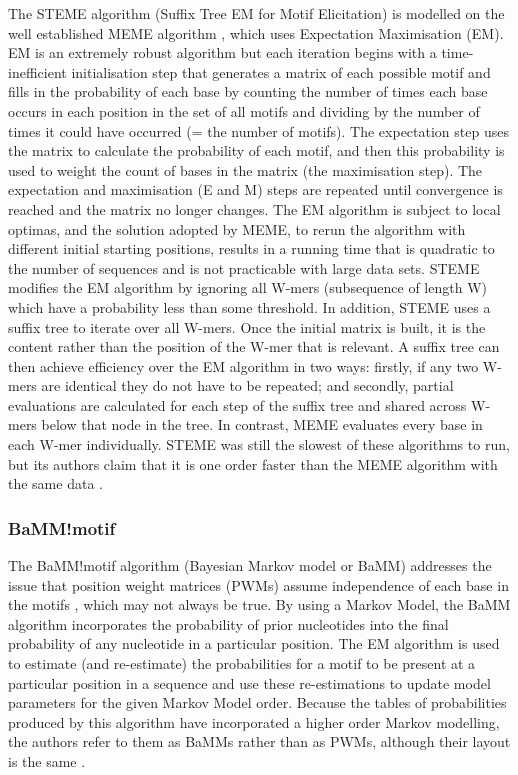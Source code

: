 \documentclass[12pt, onecolumn, oneside]{gsajnl}
\begin{document}
The STEME algorithm (Suffix Tree EM for Motif Elicitation) \citep{reid2011steme} is modelled on the well established MEME algorithm \citep{bailey2009meme}, which uses Expectation Maximisation (EM). EM is an extremely robust algorithm but each iteration begins with a time-inefficient initialisation step that generates a matrix of each possible motif and fills in the probability of each base by counting the number of times each base occurs in each position in the set of all motifs and dividing by the number of times it could have occurred (= the number of motifs). The expectation step uses the matrix to calculate the probability of each motif, and then this probability is used to weight the count of bases in the matrix (the maximisation step). The expectation and maximisation (E and M) steps are repeated until convergence is reached and the matrix no longer changes. The EM algorithm is subject to local optimas, and the solution adopted by MEME, to rerun the algorithm with different initial starting positions, results in a running time that is quadratic to the number of sequences and is not practicable with large data sets. STEME modifies the EM algorithm by ignoring all W-mers (subsequence of length W) which have a probability less than some threshold. In addition, STEME uses a suffix tree to iterate over all W-mers. Once the initial matrix is built, it is the content rather than the position of the W-mer that is relevant. A suffix tree can then achieve efficiency over the EM algorithm in two ways: firstly, if any two W-mers are identical they do not have to be repeated; and secondly, partial evaluations are calculated for each step of the suffix tree and shared across W-mers below that node in the tree. In contrast, MEME evaluates every base in each W-mer individually. STEME was still the slowest of these algorithms to run, but its authors claim that it is one order faster than the MEME algorithm with the same data \citep{reid2011steme}.

\subsubsection{BaMM!motif\;\;}

 The BaMM!motif algorithm (Bayesian Markov model or BaMM) \citep{siebert2016bayesian} addresses the issue that position weight matrices (PWMs) assume independence of each base in the motifs \citep{jayaram2016evaluating}, which may not always be true. By using a Markov Model, the BaMM algorithm incorporates the probability of prior nucleotides into the final probability of any nucleotide in a particular position. The EM algorithm is used to estimate (and re-estimate) the probabilities for a motif to be present at a particular position in a sequence and use these re-estimations to update model parameters for the given Markov Model order. Because the tables of probabilities produced by this algorithm have incorporated a higher order Markov modelling, the authors refer to them as BaMMs rather than as PWMs, although their layout is the same \citep{siebert2016bayesian}.
\end{document}
